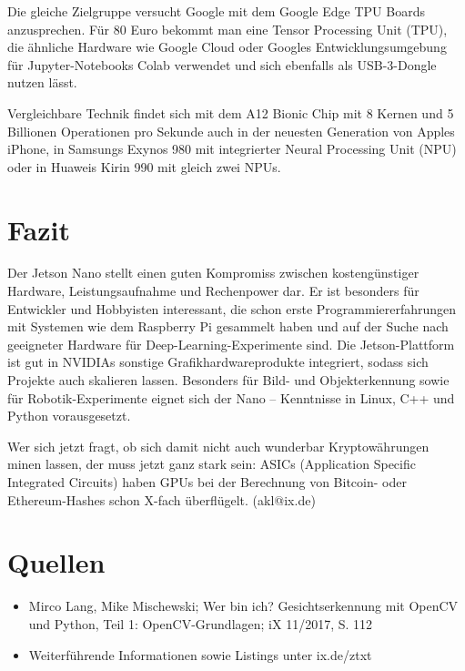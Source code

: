 Die gleiche Zielgruppe versucht Google mit dem Google Edge TPU Boards anzusprechen. Für 80 Euro bekommt man eine Tensor Processing Unit (TPU), die ähnliche Hardware wie Google Cloud oder Googles Entwicklungsumgebung für Jupyter-Notebooks Colab verwendet und sich ebenfalls als USB-3-Dongle nutzen lässt. 

Vergleichbare Technik findet sich mit dem A12 Bionic Chip mit 8 Kernen und 5 Billionen Operationen pro Sekunde auch in der neuesten Generation von Apples iPhone, in Samsungs Exynos 980 mit integrierter Neural Processing Unit (NPU) oder in Huaweis Kirin 990 mit gleich zwei NPUs. 

\section{Fazit}

Der Jetson Nano stellt einen guten Kompromiss zwischen kostengünstiger Hardware, Leistungsaufnahme und Rechen­power dar. Er ist besonders für Entwickler und Hobbyisten interessant, die schon erste Programmiererfahrungen mit Systemen wie dem Raspberry Pi gesammelt haben und auf der Suche nach geeigneter Hardware für Deep-Learning-Experimente sind. Die Jetson-Plattform ist gut in NVIDIAs sonstige Grafikhardwareprodukte integriert, sodass sich Projekte auch skalieren lassen. Besonders für Bild- und Objekterkennung sowie für Robotik-­Experimente eignet sich der Nano – Kenntnisse in Linux, C++ und Python vorausgesetzt. 

Wer sich jetzt fragt, ob sich damit nicht auch wunderbar Kryptowährungen minen lassen, der muss jetzt ganz stark sein: ASICs (Application Specific Integrated Circuits) haben GPUs bei der Berechnung von Bitcoin- oder Ethereum-Hashes schon X-fach überflügelt. (akl@ix.de) 


\section{Quellen}

\begin{itemize}
  \item [1] Mirco Lang, Mike Mischewski; Wer bin ich? Gesichtserkennung mit OpenCV und Python, Teil 1: OpenCV-Grundlagen; iX 11/2017, S. 112 
  \item [2] Weiterführende Informationen sowie Listings unter ix.de/ztxt
\end{itemize}
